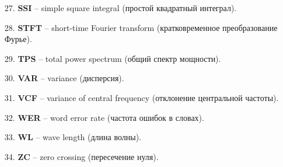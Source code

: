 \begin{itemize}
    \item[27.] \textbf{SSI} -- simple square integral (простой квадратный интеграл).
    \item[28.] \textbf{STFT} -- short-time Fourier transform (кратковременное преобразование Фурье).
    \item[29.] \textbf{TPS} -- total power spectrum (общий спектр мощности).
    \item[30.] \textbf{VAR} -- variance (дисперсия).
    \item[31.] \textbf{VCF} -- variance of central frequency (отклонение центральной частоты).
    \item[32.] \textbf{WER} -- word error rate (частота ошибок в словах).
    \item[33.] \textbf{WL} -- wave length (длина волны).
    \item[34.] \textbf{ZC} -- zero crossing (пересечение нуля). 
\end{itemize}
